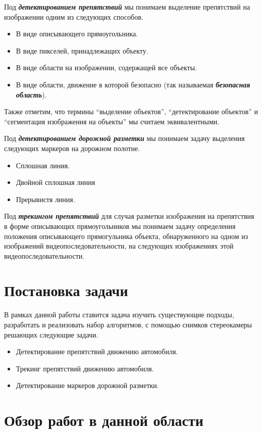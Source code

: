 \documentclass[aps,%
14pt,%
final,%
oneside,
onecolumn,%
musixtex, %
superscriptaddress,%
centertags]{extarticle} %
\begin{document}
Под \textit{\textbf{детектированием препятствий}} мы понимаем выделение препятствий на изображении одним из следующих способов.
\begin{itemize}
    \item В виде описывающего прямоугольника.
    \item В виде пикселей, принадлежащих объекту.
    \item В виде области на изображении, содержащей все объекты.
    \item В виде области, движение в которой безопасно (так называемая \textit{\textbf{безопасная область}}).
\end{itemize}
Также отметим, что термины ``выделение объектов'', ``детектирование объектов'' и ``сегментация изображения на объекты'' мы считаем эквивалентными.

Под \textit{\textbf{детектированием дорожной разметки}} мы понимаем задачу выделения следующих маркеров на дорожном полотне.
\begin{itemize}
    \item Сплошная линия.
    \item Двойной сплошная линия
    \item Прерывистя линия.
\end{itemize}

Под \textit{\textbf{трекингом препятствий}} для случая разметки изображения на препятствия в форме описывающих прямоугольников мы понимаем задачу определения положения описывающего прямогульника объекта, обнаруженного на одном из изображений видеопоследовательности, на следующих изображениях этой видеопоследовательности.

\section{Постановка задачи}

В рамках данной работы ставится задача изучить существующие подходы, разработать и реализовать набор алгоритмов, с помощью снимков стереокамеры  решающих следующие задачи.
\begin{itemize}
    \item Детектирование препятствий движению автомобиля.
    \item Трекинг препятствий движению автомобиля.
    \item Детектирование маркеров дорожной разметки.
\end{itemize} 

\section{Обзор работ в данной области}
\end{document}
